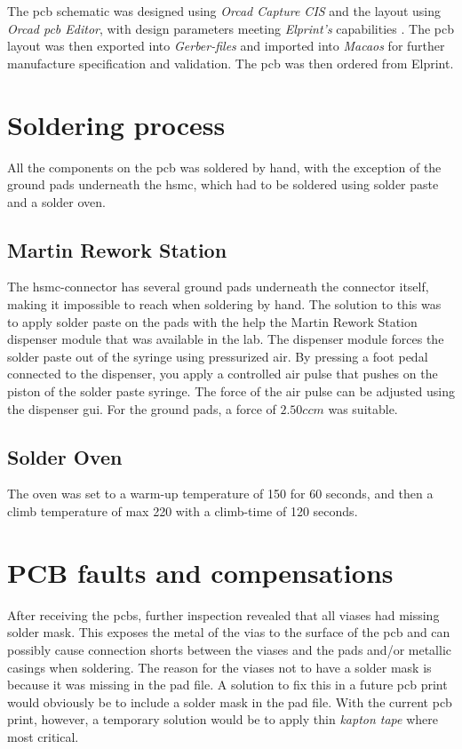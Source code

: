 \documentclass[main.tex]{subfiles}
\begin{document}
The \gls{pcb} schematic was designed using \textit{Orcad Capture CIS} and the layout using \textit{Orcad \gls{pcb} Editor}, with design parameters meeting \textit{Elprint's} capabilities \cite{elprint15}. The \gls{pcb} layout was then exported into \textit{Gerber-files} and imported into \textit{Macaos} for further manufacture specification and validation. The \gls{pcb} was then ordered from Elprint.%

\section{Soldering process}

All the components on the \gls{pcb} was soldered by hand, with the exception of the ground pads underneath the \gls{hsmc}, which had to be soldered using solder paste and a solder oven.

\subsection{Martin Rework Station}

The \gls{hsmc}-connector has several ground pads underneath the connector itself, making it impossible to reach when soldering by hand. The solution to this was to apply solder paste on the pads with the help the Martin Rework Station dispenser module that was available in the lab. The dispenser module forces the solder paste out of the syringe using pressurized air. By pressing a foot pedal connected to the dispenser, you apply a controlled air pulse that pushes on the piston of the solder paste syringe. The force of the air pulse can be adjusted using the dispenser \gls{gui}. For the ground pads, a force of $2.50 ccm$ was suitable.  

\subsection{Solder Oven}

The oven was set to a warm-up temperature of 150  for 60 seconds, and then a climb temperature of max 220 with a climb-time of 120 seconds.

\section{PCB faults and compensations}

After receiving the \glspl{pcb}, further inspection revealed that all viases had missing solder mask. This exposes the metal of the vias to the surface of the \gls{pcb} and can possibly cause connection shorts between the viases and the pads and/or metallic casings when soldering. The reason for the viases not to have a solder mask is because it was missing in the pad file. A solution to fix this in a future \gls{pcb} print would obviously be to include a solder mask in the pad file.
With the current \gls{pcb} print, however, a temporary solution would be to apply thin \textit{kapton tape} where most critical. \\
\end{document}
